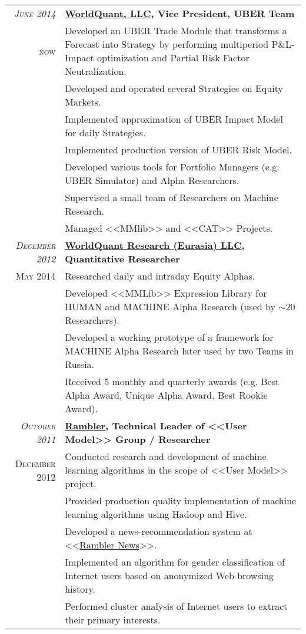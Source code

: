 \documentclass[unicode,a4paper,10pt]{article}
\begin{document}
\begin{tabular}{r p{13cm}}

 \emph{\textsc{June 2014}} & \textbf{\href{https://www.worldquant.com/}{WorldQuant, LLC}, Vice President, UBER Team} \\
\textsc{now}
&\footnotesize{Developed an UBER Trade Module that transforms a Forecast into Strategy by performing multiperiod P\&L-Impact optimization and Partial Risk Factor Neutralization.}\\
&\footnotesize{Developed and operated several Strategies on Equity Markets.}\\
&\footnotesize{Implemented approximation of UBER Impact Model for daily Strategies.}\\
&\footnotesize{Implemented production version of UBER Risk Model.}\\
&\footnotesize{Developed various tools for Portfolio Managers (e.g. UBER Simulator) and Alpha Researchers.}\\
&\footnotesize{Supervised a small team of Researchers on Machine Research.}\\
&\footnotesize{Managed <<MMlib>> and <<CAT>> Projects.}\\

 \emph{\textsc{December 2012}} & \textbf{\href{https://www.worldquant.com/}{WorldQuant Research (Eurasia) LLC}, Quantitative Researcher} \\
\textsc{May 2014}
&\footnotesize{Researched daily and intraday Equity Alphas.}\\
&\footnotesize{Developed <<MMLib>> Expression Library for HUMAN and MACHINE Alpha Research (used by $\sim$20 Researchers).}\\
&\footnotesize{Developed a working prototype of a framework for MACHINE Alpha Research later used by two Teams in Russia.}\\
&\footnotesize{Received 5 monthly and quarterly awards (e.g. Best Alpha Award, Unique Alpha Award, Best Rookie Award).}\\


 \emph{\textsc{October 2011}} & \textbf{\href{http://www.rambler.ru}{Rambler}, Technical Leader of <<User Model>> Group / Researcher} \\
\textsc{December 2012}
&\footnotesize{Conducted research and development of machine learning algorithms in the scope of <<User Model>> project.}\\
&\footnotesize{Provided production quality implementation of machine learning algorithms using Hadoop and Hive.}\\
&\footnotesize{Developed a news-recommendation system at <<\href{http://news.rambler.ru}{Rambler News}>>.}\\
&\footnotesize{Implemented an algorithm for gender classification of Internet users based on anonymized Web browsing history.}\\
&\footnotesize{Performed cluster analysis of Internet users to extract their primary interests.}\\



\end{tabular}
\end{document}
